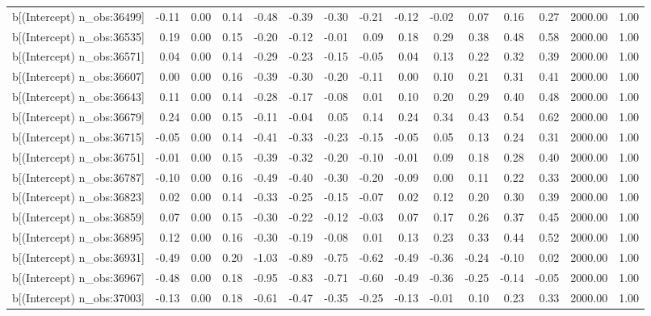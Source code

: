 \begin{table}[ht]
\begin{tabular}{rrrrrrrrrrrrrrr}
  b[(Intercept) n\_obs:36499] & -0.11 & 0.00 & 0.14 & -0.48 & -0.39 & -0.30 & -0.21 & -0.12 & -0.02 & 0.07 & 0.16 & 0.27 & 2000.00 & 1.00 \\ 
  b[(Intercept) n\_obs:36535] & 0.19 & 0.00 & 0.15 & -0.20 & -0.12 & -0.01 & 0.09 & 0.18 & 0.29 & 0.38 & 0.48 & 0.58 & 2000.00 & 1.00 \\ 
  b[(Intercept) n\_obs:36571] & 0.04 & 0.00 & 0.14 & -0.29 & -0.23 & -0.15 & -0.05 & 0.04 & 0.13 & 0.22 & 0.32 & 0.39 & 2000.00 & 1.00 \\ 
  b[(Intercept) n\_obs:36607] & 0.00 & 0.00 & 0.16 & -0.39 & -0.30 & -0.20 & -0.11 & 0.00 & 0.10 & 0.21 & 0.31 & 0.41 & 2000.00 & 1.00 \\ 
  b[(Intercept) n\_obs:36643] & 0.11 & 0.00 & 0.14 & -0.28 & -0.17 & -0.08 & 0.01 & 0.10 & 0.20 & 0.29 & 0.40 & 0.48 & 2000.00 & 1.00 \\ 
  b[(Intercept) n\_obs:36679] & 0.24 & 0.00 & 0.15 & -0.11 & -0.04 & 0.05 & 0.14 & 0.24 & 0.34 & 0.43 & 0.54 & 0.62 & 2000.00 & 1.00 \\ 
  b[(Intercept) n\_obs:36715] & -0.05 & 0.00 & 0.14 & -0.41 & -0.33 & -0.23 & -0.15 & -0.05 & 0.05 & 0.13 & 0.24 & 0.31 & 2000.00 & 1.00 \\ 
  b[(Intercept) n\_obs:36751] & -0.01 & 0.00 & 0.15 & -0.39 & -0.32 & -0.20 & -0.10 & -0.01 & 0.09 & 0.18 & 0.28 & 0.40 & 2000.00 & 1.00 \\ 
  b[(Intercept) n\_obs:36787] & -0.10 & 0.00 & 0.16 & -0.49 & -0.40 & -0.30 & -0.20 & -0.09 & 0.00 & 0.11 & 0.22 & 0.33 & 2000.00 & 1.00 \\ 
  b[(Intercept) n\_obs:36823] & 0.02 & 0.00 & 0.14 & -0.33 & -0.25 & -0.15 & -0.07 & 0.02 & 0.12 & 0.20 & 0.30 & 0.39 & 2000.00 & 1.00 \\ 
  b[(Intercept) n\_obs:36859] & 0.07 & 0.00 & 0.15 & -0.30 & -0.22 & -0.12 & -0.03 & 0.07 & 0.17 & 0.26 & 0.37 & 0.45 & 2000.00 & 1.00 \\ 
  b[(Intercept) n\_obs:36895] & 0.12 & 0.00 & 0.16 & -0.30 & -0.19 & -0.08 & 0.01 & 0.13 & 0.23 & 0.33 & 0.44 & 0.52 & 2000.00 & 1.00 \\ 
  b[(Intercept) n\_obs:36931] & -0.49 & 0.00 & 0.20 & -1.03 & -0.89 & -0.75 & -0.62 & -0.49 & -0.36 & -0.24 & -0.10 & 0.02 & 2000.00 & 1.00 \\ 
  b[(Intercept) n\_obs:36967] & -0.48 & 0.00 & 0.18 & -0.95 & -0.83 & -0.71 & -0.60 & -0.49 & -0.36 & -0.25 & -0.14 & -0.05 & 2000.00 & 1.00 \\ 
  b[(Intercept) n\_obs:37003] & -0.13 & 0.00 & 0.18 & -0.61 & -0.47 & -0.35 & -0.25 & -0.13 & -0.01 & 0.10 & 0.23 & 0.33 & 2000.00 & 1.00 \\ 

\end{tabular}
\end{table}
